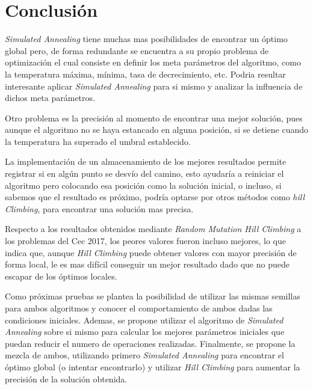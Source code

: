 \documentclass[12pt,twoside]{article}
\begin{document}
	\clearpage
	\section{Conclusión}
	
	\textit{Simulated Annealing} tiene muchas mas posibilidades de encontrar un óptimo global pero, de forma redundante se encuentra a su propio problema de optimización el cual consiste en definir los meta parámetros del algoritmo, como la temperatura máxima, mínima, tasa de decrecimiento, etc. Podria resultar interesante aplicar \textit{Simulated Annealing} para si mismo y analizar la influencia de dichos meta parámetros.
	
	Otro problema es la precisión al momento de encontrar una mejor solución, pues aunque el algoritmo no se haya estancado en alguna posición, si se detiene cuando la temperatura ha superado el umbral establecido.
	
	La implementación de un almacenamiento de los mejores resultados permite registrar si en algún punto se desvío del camino, esto ayudaría a reiniciar el algoritmo pero colocando esa posición como la solución inicial, o incluso, si sabemos que el resultado es próximo, podría optarse por otros métodos como \textit{hill Climbing}, para encontrar una solución mas precisa.
	
	Respecto a los resultados obtenidos mediante \textit{Random Mutation Hill Climbing} a los problemas del Cec 2017, los peores valores fueron incluso mejores, lo que indica que, aunque \textit{Hill Climbing} puede obtener valores con mayor precisión de forma local, le es mas difícil conseguir un mejor resultado dado que no puede escapar de los óptimos locales. 
	
	Como próximas  pruebas se plantea la posibilidad de utilizar las mismas semillas para ambos algoritmos y conocer el comportamiento de ambos dadas las condiciones iniciales. Ademas, se propone utilizar el algoritmo de \textit{Simulated Annealing} sobre si mismo para calcular los mejores parámetros iniciales que puedan reducir el numero de operaciones realizadas. Finalmente, se propone la mezcla de ambos, utilizando primero \textit{Simulated Annealing} para encontrar el óptimo global (o intentar encontrarlo) y utilizar \textit{Hill Climbing} para aumentar la precisión de la solución obtenida.
	
	
	\clearpage
	
	
	
\end{document}
